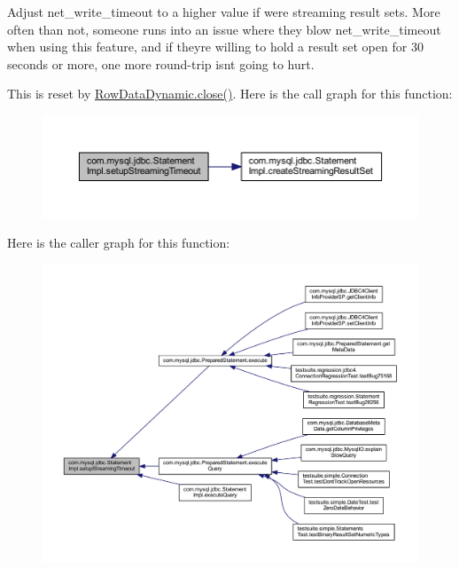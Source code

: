 Adjust net\+\_\+write\+\_\+timeout to a higher value if we\textquotesingle{}re streaming result sets. More often than not, someone runs into an issue where they blow net\+\_\+write\+\_\+timeout when using this feature, and if they\textquotesingle{}re willing to hold a result set open for 30 seconds or more, one more round-\/trip isn\textquotesingle{}t going to hurt.

This is reset by \mbox{\hyperlink{classcom_1_1mysql_1_1jdbc_1_1_row_data_dynamic_a284d8e7db5b779d4c20de17f1f5b8c5c}{Row\+Data\+Dynamic.\+close()}}. Here is the call graph for this function\+:
\nopagebreak
\begin{figure}[H]
\begin{center}
\leavevmode
\includegraphics[width=350pt]{classcom_1_1mysql_1_1jdbc_1_1_statement_impl_ab0949d4db6b617c32d22ace0ed1a7ac7_cgraph}
\end{center}
\end{figure}
Here is the caller graph for this function\+:
\nopagebreak
\begin{figure}[H]
\begin{center}
\leavevmode
\includegraphics[width=350pt]{classcom_1_1mysql_1_1jdbc_1_1_statement_impl_ab0949d4db6b617c32d22ace0ed1a7ac7_icgraph}
\end{center}
\end{figure}


